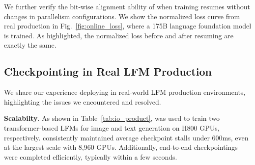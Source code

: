 We further verify the bit-wise alignment ability of \sys{} when training resumes without changes in parallelism configurations.
We show the normalized loss curve from real production in Fig.~\ref{fig:online_loss}, where a 175B language foundation model is trained.
As highlighted, the normalized loss before and after resuming are exactly the same.
\subsection{Checkpointing in Real LFM Production}
\label{sec:exp_product}
We share our experience deploying \sys{} in real-world LFM production environments, highlighting the issues we encountered and resolved.

\noindent \textbf{Scalabilty}.
As shown in Table~\ref{tab:io_product}, \sys{} was used to train two transformer-based LFMs for image and text generation on H800 GPUs, respectively. 
\sys{} consistently maintained average checkpoint stalls under 600ms, even at the largest scale with 8,960 GPUs.
Additionally, end-to-end checkpointings were completed efficiently, typically within a few seconds.

